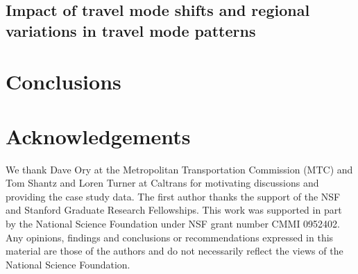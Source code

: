 \documentclass[twoside]{article}
\begin{document}
	\subsection{Impact of travel mode shifts and regional variations in travel mode patterns}
	\label{sec:accDisc}
	

\section{Conclusions}
\label{sec:accConc}


\section{Acknowledgements}
\label{sec:accAckn}
We thank Dave Ory at the Metropolitan Transportation Commission (MTC) and Tom Shantz and Loren Turner at Caltrans for motivating discussions and providing the case study data. The first author thanks the support of the NSF and Stanford Graduate Research Fellowships. This work was supported in part by the National Science Foundation under NSF grant number CMMI 0952402. Any opinions, findings and conclusions or recommendations expressed in this material are those of the authors and do not necessarily reflect the views of the National Science Foundation.














\end{document}
